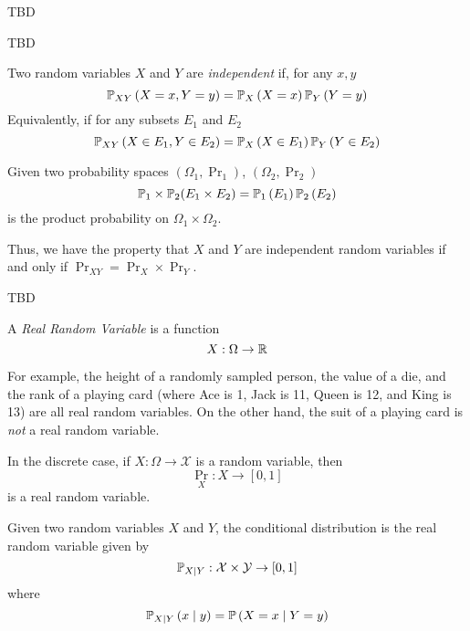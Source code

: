 \begin{example}
    TBD
\end{example}

\begin{example}
    TBD
\end{example}

\begin{definition}
    Two random variables $X$ and $Y$ are \emph{independent} if, for any $x, y$
    \[\prob[XY]{X=x, Y=y} = \prob[X]{X=x}\prob[Y]{Y=y}\]
    Equivalently, if for any subsets $E_1$ and $E_2$
    \[\prob[XY]{X \in E_1, Y \in E_2} = \prob[X]{X \in E_1}\prob[Y]{Y \in E_2}\]
\end{definition}

\begin{definition}
    Given two probability spaces $(\Omega_1, \Pr_1)$, $(\Omega_2, \Pr_2)$
    \[\Pr_1 \times \Pr_2(E_1 \times E_2) = \prob[1]{E_1}\prob[2]{E_2}\]
    is the product probability on $\Omega_1 \times \Omega_2$.
\end{definition}

Thus, we have the property that $X$ and $Y$ are independent random variables
if and only if $\Pr_{XY} = \Pr_X \times \Pr_Y$.

\begin{example}
    TBD
\end{example}

\begin{definition}
    A \emph{Real Random Variable} is a function
    \[X: \Omega \to \mathbb{R}\]
\end{definition}

For example, the height of a randomly sampled person, the value of a die, and the rank
of a playing card (where Ace is 1, Jack is 11, Queen is 12, and King is 13) are all
real random variables. On the other hand, the suit of a playing card is \emph{not}
a real random variable.

In the discrete case, if $X: \Omega \to \mathcal{X}$ is a random variable, then
\[\Pr_X: X \to [0, 1]\]
is a real random variable.

\begin{definition}
    Given two random variables $X$ and $Y$, the conditional distribution is the
    real random variable given by
    \[\mathbb{P}_{X \mid Y}: \mathcal{X} \times \mathcal{Y} \to [0, 1]\]
    where
    \[\prob[X \given Y]{x \given y} = \prob{X = x \given Y = y}\]
\end{definition}

